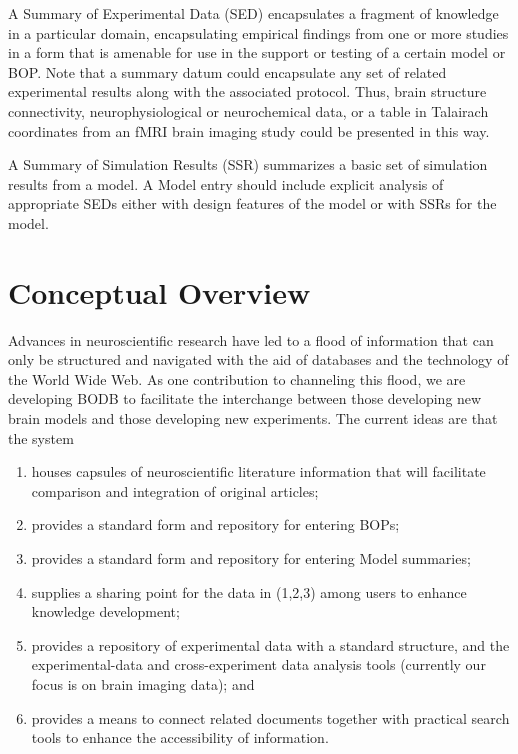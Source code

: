 \documentclass[letterpaper,10pt,english]{sphinxmanual}
\begin{document}
A Summary of Experimental Data (SED) encapsulates a fragment of knowledge in a particular domain, encapsulating empirical findings from one or more studies in a form that is amenable for use in the support or testing of a certain model or BOP. Note that a summary datum could encapsulate any set of related experimental results along with the associated protocol. Thus, brain structure connectivity, neurophysiological or neurochemical data, or a table in Talairach coordinates from an fMRI brain imaging study could be presented in this way.

A Summary of Simulation Results (SSR) summarizes a basic set of simulation results from a model. A Model entry should include explicit analysis of appropriate SEDs either with design features of the model or with SSRs for the model.


\chapter{Conceptual Overview}
\label{conceptual_overview:conceptual-overview}\label{conceptual_overview::doc}
Advances in neuroscientific research have led to a flood of information that can only be structured and navigated with the aid of databases and the technology of the World Wide Web. As one contribution to channeling this flood, we are developing BODB to facilitate the interchange between those developing new brain models and those developing new experiments. The current ideas are that the system
\begin{enumerate}
\item {} 
houses capsules of neuroscientific literature information that will facilitate comparison and integration of original articles;

\item {} 
provides a standard form and repository for entering BOPs;

\item {} 
provides a standard form and repository for entering Model summaries;

\item {} 
supplies a sharing point for the data in (1,2,3) among users to enhance knowledge development;

\item {} 
provides a repository of experimental data with a standard structure, and the experimental-data and cross-experiment data analysis tools (currently our focus is on brain imaging data); and

\item {} 
provides a means to connect related documents together with practical search tools to enhance the accessibility of information.

\end{enumerate}
\end{document}
